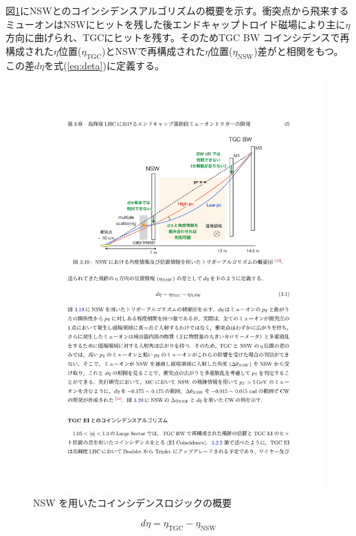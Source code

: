 図\ref{Concept_NSW}にNSWとのコインシデンスアルゴリズムの概要を示す。衝突点から飛来するミューオンはNSWにヒットを残した後エンドキャップトロイド磁場により主に$\eta$方向に曲げられ、TGCにヒットを残す。そのためTGC BW コインシデンスで再構成された$\eta$位置($\eta_{\mathrm{TGC}}$)とNSWで再構成された$\eta$位置($\eta_{\mathrm{NSW}}$)差が\pt と相関をもつ。この差$d\eta$を式(\ref{eq:deta})に定義する。

\begin{figure} 
\centering
\includegraphics[width=16cm]{fig/SL/Concept_NSW.pdf}
\caption[NSW を用いたコインシデンスロジックの概要]{NSW を用いたコインシデンスロジックの概要\cite{mt_akatsuka}}
\label{Concept_NSW}
\end{figure}

\begin{equation}
    d\eta = \eta_{\mathrm{TGC}} - \eta_{\mathrm{NSW}}
    \label{eq:deta}
\end{equation}


